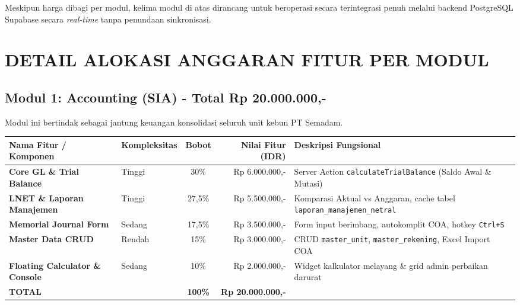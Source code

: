 \documentclass[11pt,a4paper]{article}
\begin{document}
\begin{notealert}
Meskipun harga dibagi per modul, kelima modul di atas dirancang untuk beroperasi secara terintegrasi penuh melalui backend PostgreSQL Supabase secara \textit{real-time} tanpa penundaan sinkronisasi.
\end{notealert}

\newpage

\section{DETAIL ALOKASI ANGGARAN FITUR PER MODUL}

\subsection{Modul 1: Accounting (SIA) - Total Rp 20.000.000,-}
Modul ini bertindak sebagai jantung keuangan konsolidasi seluruh unit kebun PT Semadam.

\begin{table}[h!]
\centering
\scriptsize
\begin{tabular}{llcrl}
    \toprule
    \textbf{Nama Fitur / Komponen} & \textbf{Kompleksitas} & \textbf{Bobot} & \textbf{Nilai Fitur (IDR)} & \textbf{Deskripsi Fungsional} \\
    \midrule
    \textbf{Core GL \& Trial Balance} & Tinggi & 30\% & Rp 6.000.000,- & Server Action \texttt{calculateTrialBalance} (Saldo Awal \& Mutasi) \\
    \textbf{LNET \& Laporan Manajemen} & Tinggi & 27,5\% & Rp 5.500.000,- & Komparasi Aktual vs Anggaran, cache tabel \texttt{laporan\_manajemen\_netral} \\
    \textbf{Memorial Journal Form} & Sedang & 17,5\% & Rp 3.500.000,- & Form input berimbang, autokomplit COA, hotkey \texttt{Ctrl+S} \\
    \textbf{Master Data CRUD} & Rendah & 15\% & Rp 3.000.000,- & CRUD \texttt{master\_unit}, \texttt{master\_rekening}, Excel Import COA \\
    \textbf{Floating Calculator \& Console} & Sedang & 10\% & Rp 2.000.000,- & Widget kalkulator melayang \& grid admin perbaikan darurat \\
    \midrule
    \textbf{TOTAL} & & \textbf{100\%} & \textbf{Rp 20.000.000,-} & \\
    \bottomrule
\end{tabular}
\end{table}
\end{document}
